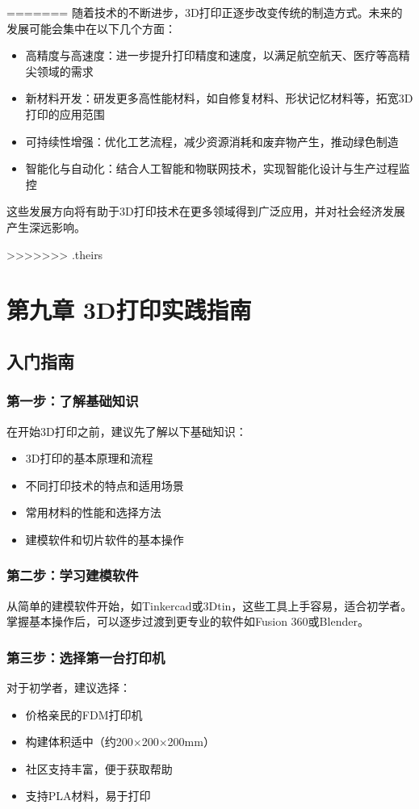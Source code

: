 \documentclass[12pt,UTF8]{ctexbook}
\begin{document}
=======
随着技术的不断进步，3D打印正逐步改变传统的制造方式。未来的发展可能会集中在以下几个方面：
    
    \begin{itemize}
        \item 高精度与高速度：进一步提升打印精度和速度，以满足航空航天、医疗等高精尖领域的需求
        \item 新材料开发：研发更多高性能材料，如自修复材料、形状记忆材料等，拓宽3D打印的应用范围
        \item 可持续性增强：优化工艺流程，减少资源消耗和废弃物产生，推动绿色制造
        \item 智能化与自动化：结合人工智能和物联网技术，实现智能化设计与生产过程监控
    \end{itemize}
    
这些发展方向将有助于3D打印技术在更多领域得到广泛应用，并对社会经济发展产生深远影响。








>>>>>>> .theirs
\chapter{第九章 3D打印实践指南}

\section{入门指南}

\subsection{第一步：了解基础知识}
在开始3D打印之前，建议先了解以下基础知识：
\begin{itemize}
\item 3D打印的基本原理和流程
\item 不同打印技术的特点和适用场景
\item 常用材料的性能和选择方法
\item 建模软件和切片软件的基本操作
\end{itemize}

\subsection{第二步：学习建模软件}
从简单的建模软件开始，如Tinkercad或3Dtin，这些工具上手容易，适合初学者。掌握基本操作后，可以逐步过渡到更专业的软件如Fusion 360或Blender。

\subsection{第三步：选择第一台打印机}
对于初学者，建议选择：
\begin{itemize}
\item 价格亲民的FDM打印机
\item 构建体积适中（约200$\times$200$\times$200mm）
\item 社区支持丰富，便于获取帮助
\item 支持PLA材料，易于打印
\end{itemize}
\end{document}
